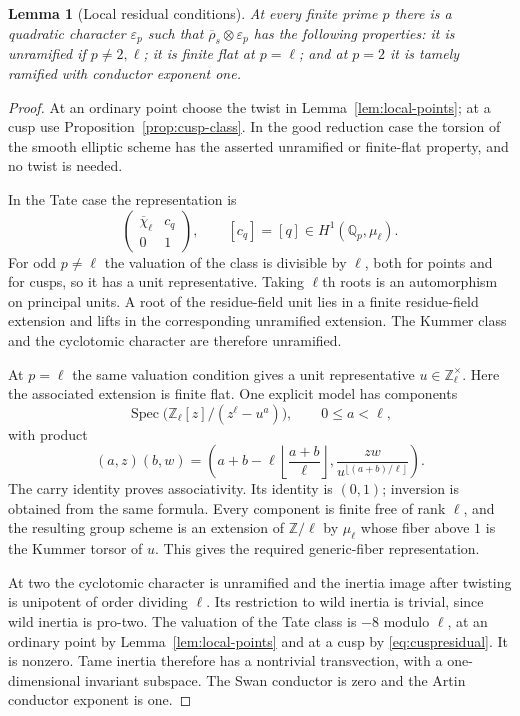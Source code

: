 \documentclass[11pt,a4paper]{article}
\newcommand{\Q}{\mathbb Q}
\newcommand{\Z}{\mathbb Z}
\newcommand{\eps}{\varepsilon}
\DeclareMathOperator{\Spec}{Spec}
\theoremstyle{plain}
\newtheorem{lemma}[theorem]{Lemma}
\theoremstyle{definition}
\begin{document}
\begin{lemma}[Local residual conditions]\label{lem:local-residual}
At every finite prime $p$ there is a quadratic character $\eps_p$ such
that $\overline\rho_s\otimes\eps_p$ has the following properties:
it is unramified if $p\neq2,\ell$; it is finite flat at $p=\ell$;
and at $p=2$ it is tamely ramified with conductor exponent one.
\end{lemma}
\begin{proof}
At an ordinary point choose the twist in Lemma~\ref{lem:local-points};
at a cusp use Proposition~\ref{prop:cusp-class}. In the good reduction
case the torsion of the smooth elliptic scheme has the asserted
unramified or finite-flat property, and no twist is needed.

In the Tate case the representation is
\[
 \begin{pmatrix}\overline\chi_\ell&c_q\\0&1\end{pmatrix},
 \qquad[c_q]=[q]\in H^1(\Q_p,\mu_\ell).
\]
For odd $p\neq\ell$ the valuation of the class is divisible by
$\ell$, both for points and for cusps, so it has a unit representative.
Taking $\ell$th roots is an automorphism on principal units. A root of
the residue-field unit lies in a finite residue-field extension and
lifts in the corresponding unramified extension. The Kummer class
and the cyclotomic character are therefore unramified.

At $p=\ell$ the same valuation condition gives a unit representative
$u\in\Z_\ell^\times$. Here the associated extension is finite flat.
One explicit model has components
\[
 \Spec\bigl(\Z_\ell[z]/(z^\ell-u^a)\bigr),\qquad0\leq a<\ell,
\]
with product
\[
 (a,z)(b,w)=
 \left(a+b-\ell\left\lfloor\frac{a+b}{\ell}\right\rfloor,
 \frac{zw}{u^{\lfloor(a+b)/\ell\rfloor}}\right).
\]
The carry identity proves associativity. Its identity is $(0,1)$;
inversion is obtained from the same formula. Every component is finite
free of rank $\ell$, and the resulting group scheme is an extension
of $\Z/\ell$ by $\mu_\ell$ whose fiber above $1$ is the Kummer torsor
of $u$. This gives the required generic-fiber representation.

At two the cyclotomic character is unramified and the inertia image
after twisting is unipotent of order dividing $\ell$. Its restriction
to wild inertia is trivial, since wild inertia is pro-two. The
valuation of the Tate class is $-8$ modulo $\ell$, at an ordinary
point by Lemma~\ref{lem:local-points} and at a cusp by
\eqref{eq:cuspresidual}. It is nonzero. Tame inertia therefore has a
nontrivial transvection, with a one-dimensional invariant subspace.
The Swan conductor is zero and the Artin conductor exponent is one.
\end{proof}
\end{document}
